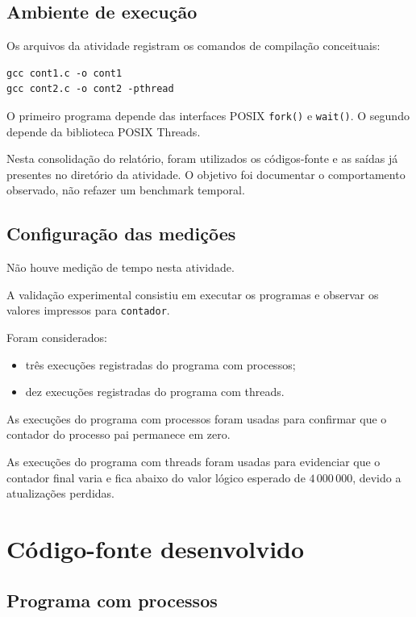 \subsection{Ambiente de execução}

Os arquivos da atividade registram os comandos de compilação conceituais:

\begin{verbatim}
gcc cont1.c -o cont1
gcc cont2.c -o cont2 -pthread
\end{verbatim}

O primeiro programa depende das interfaces POSIX \texttt{fork()} e \texttt{wait()}. O segundo depende da biblioteca POSIX Threads.

Nesta consolidação do relatório, foram utilizados os códigos-fonte e as saídas já presentes no diretório da atividade. O objetivo foi documentar o comportamento observado, não refazer um benchmark temporal.

\subsection{Configuração das medições}

Não houve medição de tempo nesta atividade.

A validação experimental consistiu em executar os programas e observar os valores impressos para \texttt{contador}.

Foram considerados:

\begin{itemize}
    \item três execuções registradas do programa com processos;
    \item dez execuções registradas do programa com threads.
\end{itemize}

As execuções do programa com processos foram usadas para confirmar que o contador do processo pai permanece em zero.

As execuções do programa com threads foram usadas para evidenciar que o contador final varia e fica abaixo do valor lógico esperado de \(4\,000\,000\), devido a atualizações perdidas.

\section{Código-fonte desenvolvido}
\label{sec:atvd03-codigo}

\subsection{Programa com processos}

